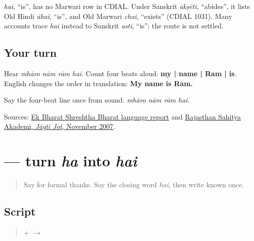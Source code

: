 \begin{cousinweb}
\emph{hai}, \textquotedblleft{}is\textquotedblright{}, has no Marwari row in CDIAL. Under Sanskrit \emph{ākṣēti}, \textquotedblleft{}abides\textquotedblright{}, it lists Old Hindi \emph{āhaï}, \textquotedblleft{}is\textquotedblright{}, and Old Marwari \emph{chai}, \textquotedblleft{}exists\textquotedblright{} (CDIAL 1031). Many accounts trace \emph{hai} instead to Sanskrit \emph{asti}, \textquotedblleft{}is\textquotedblright{}; the route is not settled.
\end{cousinweb}

\subsection*{Your turn}
Hear \emph{mhāro nām rām hai}. Count four beats aloud: \textbf{my | name | Ram | is}. English changes the order in translation: \textbf{My name is Ram.}

\begin{tcolorbox}[breakable,colback=teal!4,colframe=teal!35!black,title={Before you move on}]
Say the four-beat line once from sound: \emph{mhāro nām rām hai}.

Sources: \href{https://www.rgmcet.edu.in/assets/img/documents/Campus\%20Life/Other\%20Reports.pdf}{Ek Bharat Shreshtha Bharat language report} and \href{https://rsad.artandculture.rajasthan.gov.in/content/dam/doitassets/art-and-culture/Rajasthani-Bhasha-Sahitya-Avm-Sanskriti-Academy-Bikaner/pdf/JJ\_All\_Pdf/JJ\_36\_08\_08\_November\_to\_November\_2007.pdf}{Rajasthan Sahitya Akademi, \emph{Jāgtī Jot}, November 2007}.
\end{tcolorbox}
\section[\texorpdfstring{\mw{ै} (ai-mātrā)}{ै (ai-mātrā)}]{ — turn \emph{ha} into \emph{hai}}

\label{lesson:MW-W05-ai-matra}



\begin{quote}
Say \textbf{} for formal thanks. Say the closing word \emph{hai}, then write known \textbf{} once.
\end{quote}

\subsection*{Script}
\begin{quote}
 +  $\to$ 
\end{quote}

